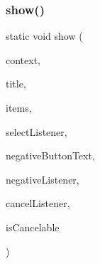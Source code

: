 \subsubsection{\texorpdfstring{show()}{show()}\hspace{0.1cm}{\footnotesize\ttfamily [3/3]}}
{\footnotesize\ttfamily static void show (\begin{DoxyParamCaption}\item[{@Non\+Null final Context}]{context,  }\item[{@Non\+Null final String}]{title,  }\item[{@Non\+Null final Char\+Sequence \mbox{[}$\,$\mbox{]}}]{items,  }\item[{@Nullable final Dialog\+Interface.\+On\+Click\+Listener}]{select\+Listener,  }\item[{@Nullable final String}]{negative\+Button\+Text,  }\item[{@Nullable final Dialog\+Interface.\+On\+Click\+Listener}]{negative\+Listener,  }\item[{@Nullable final Dialog\+Interface.\+On\+Cancel\+Listener}]{cancel\+Listener,  }\item[{final boolean}]{is\+Cancelable }\end{DoxyParamCaption})\hspace{0.3cm}{\ttfamily [static]}}

